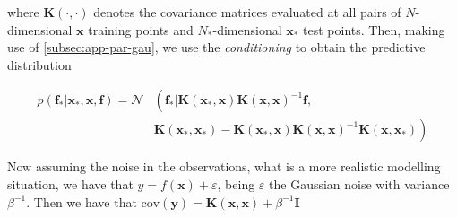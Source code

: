 \documentclass[11pt]{article} %
\begin{document}
where $\mathbf{K}(\cdot,\cdot)$ denotes the covariance matrices evaluated at all pairs of $N$-dimensional $\mathbf{x}$ training points and $N_*$-dimensional $\mathbf{x_*}$ test points. Then, making use of \autoref{subsec:app-par-gau}, we use the \textit{conditioning} to obtain the predictive distribution

\begin{equation}
\begin{aligned}
      p(\mathbf{f_*}|\mathbf{x_*},\mathbf{x},\mathbf{f}) = \mathcal{N} & \left( \mathbf{f_*} | \mathbf{K}(\mathbf{x_*},\mathbf{x})\mathbf{K}(\mathbf{x},\mathbf{x})^{-1}\mathbf{f}, \right. \\ & \left. \mathbf{K}(\mathbf{x_*},\mathbf{x_*})-\mathbf{K}(\mathbf{x_*},\mathbf{x})\mathbf{K}(\mathbf{x},\mathbf{x})^{-1}\mathbf{K}(\mathbf{x},\mathbf{x_*}) \right)
\end{aligned}
\end{equation}

Now assuming the noise in the observations, what is a more realistic modelling situation, we have that $y = f(\mathbf{x}) + \varepsilon$, being $\varepsilon$ the Gaussian noise with variance $\beta^{-1}$. Then we have that $\mathrm{cov}(\mathbf{y})=\mathbf{K}(\mathbf{x},\mathbf{x}) + \beta^{-1}\mathbf{I}$





\lipsum[1]

\newpage


\newpage

\end{document}
